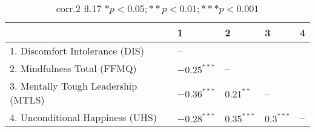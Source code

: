 \begin{table}[ht]
\centering
\begin{tabular}{lllll}
  \hline
 & 1 & 2 & 3 & 4 \\ 
  \hline
1. Discomfort Intolerance (DIS) & -- &  &  &  \\ 
  2. Mindfulness Total (FFMQ) & $-0.25^{***}$ & -- &  &  \\ 
  3. Mentally Tough Leadership (MTLS) & $-0.36^{***}$ & $0.21^{**}$ & -- &  \\ 
  4. Unconditional Happiness (UHS) & $-0.28^{***}$ & $0.35^{***}$ & $0.3^{***}$ & -- \\ 
   \hline
\end{tabular}
\caption{corr.2 fl.17 $* p < 0.05; ** p < 0.01; *** p < 0.001$} 
\label{freq_corr.corr.2.fl.17}
\end{table}
